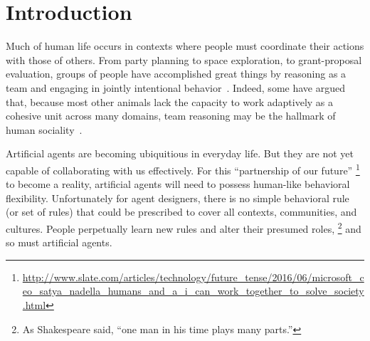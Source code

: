 
\section{Introduction}
\label{sec:intro}

Much of human life occurs in contexts where people must coordinate
their actions with those of others.  From party planning to space
exploration, to grant-proposal evaluation, groups of people have
accomplished great things by reasoning as a team and engaging in
jointly intentional behavior~\cite{searle1995construction}.  Indeed,
some have argued that, because most other animals lack the capacity to
work adaptively as a cohesive unit across many domains, team reasoning
may be the hallmark of human
sociality~\cite{tomasello2005understanding}.


Artificial agents are becoming ubiquitious in everyday life.  But they
are not yet capable of collaborating with us effectively.  For this
``partnership of our future''%
\footnote{\url{http://www.slate.com/articles/technology/future_tense/2016/06/microsoft_ceo_satya_nadella_humans_and_a_i_can_work_together_to_solve_society.html}}
to become a reality, artificial agents will need to possess human-like
behavioral flexibility.  Unfortunately for agent designers, there is
no simple behavioral rule (or set of rules) that could be prescribed
to cover all contexts, communities, and cultures.  People perpetually
learn new rules and alter their presumed roles,%
\footnote{As Shakespeare said, ``one man in his time plays many parts.''}
and so must artificial agents.




